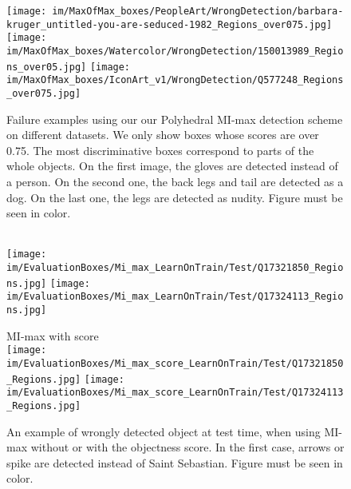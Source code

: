 \documentclass[preprint]{elsarticle}
\newcommand\MILS{MI-max}
\newcommand\MaxOfMaxS{Polyhedral MI-max}
\newcommand{\heightimageWatercolor}{2cm}
\begin{document}
\begin{figure}
\centering
  \hfill
  \texttt{[image: im/MaxOfMax\_boxes/PeopleArt/WrongDetection/barbara-kruger\_untitled-you-are-seduced-1982\_Regions\_over075.jpg]} 
     \hfill 
     \texttt{[image: im/MaxOfMax\_boxes/Watercolor/WrongDetection/150013989\_Regions\_over05.jpg]}\hfill
          \texttt{[image: im/MaxOfMax\_boxes/IconArt\_v1/WrongDetection/Q577248\_Regions\_over075.jpg]}\hfill  \caption{Failure examples using our our \MaxOfMaxS{} detection scheme on different datasets. We only show boxes whose scores are over 0.75. The most discriminative boxes correspond to parts of the whole objects. On the first image, the gloves are detected instead of a person. On the second one, the  back legs and tail are detected as a dog. On the last one, the legs are detected as nudity. Figure must be seen in color.}
    \label{fig:DetectionOfDiscriminativeElements}
\end{figure}

\begin{figure}[h]
\centering
  \hfill
\begin{minipage}[c]{.46\linewidth}
\center
{\tiny \MIL{} }\\
     \texttt{[image: im/EvaluationBoxes/Mi\_max\_LearnOnTrain/Test/Q17321850\_Regions.jpg]}
     \hspace*{0.5mm}
     \texttt{[image: im/EvaluationBoxes/Mi\_max\_LearnOnTrain/Test/Q17324113\_Regions.jpg]}\end{minipage}
     \hfill  
\begin{minipage}[c]{.46\linewidth}
\center
{\tiny \MILS{} with score} \\
 \texttt{[image: im/EvaluationBoxes/Mi\_max\_score\_LearnOnTrain/Test/Q17321850\_Regions.jpg]} \hspace*{0.5mm} 
 \texttt{[image: im/EvaluationBoxes/Mi\_max\_score\_LearnOnTrain/Test/Q17324113\_Regions.jpg]}\end{minipage}
     \hspace*{\fill} 
    \caption{An example of wrongly detected object at test time, when using \MILS{} without or with the objectness score. In the first case, arrows or spike are detected instead of Saint Sebastian. Figure must be seen in color.}
    \label{fig:Bowes_without_and_withScore}
\end{figure}
\end{document}
